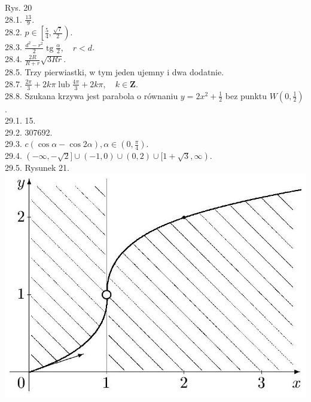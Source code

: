 \documentclass[10pt]{article}
\begin{document}
Rys. 20\\
28.1. $\frac{13}{9}$.\\
28.2. $p \in\left[\frac{5}{4}, \frac{\sqrt{7}}{2}\right)$.\\
28.3. $\frac{d^{2}-r^{2}}{2} \operatorname{tg} \frac{\alpha}{2}, \quad r<d$.\\
28.4. $\frac{2 R}{R+r} \sqrt{3 R r}$.\\
28.5. Trzy pierwiastki, w tym jeden ujemny i dwa dodatnie.\\
28.7. $\frac{2 \pi}{3}+2 k \pi \operatorname{lub} \frac{4 \pi}{3}+2 k \pi, \quad k \in \mathbf{Z}$.\\
28.8. Szukana krzywa jest parabola o równaniu $y=2 x^{2}+\frac{1}{2}$ bez punktu $W\left(0, \frac{1}{2}\right)$.\\
29.1. 15.\\
29.2. 307692.\\
29.3. $c(\cos \alpha-\cos 2 \alpha), \alpha \in\left(0, \frac{\pi}{4}\right)$.\\
29.4. $(-\infty,-\sqrt{2}] \cup(-1,0) \cup(0,2) \cup[1+\sqrt{3}, \infty)$.\\
29.5. Rysunek 21.\\
\includegraphics[max width=\textwidth, center]{2024_11_16_fe5b564401bf7db98894g-075}
\end{document}
